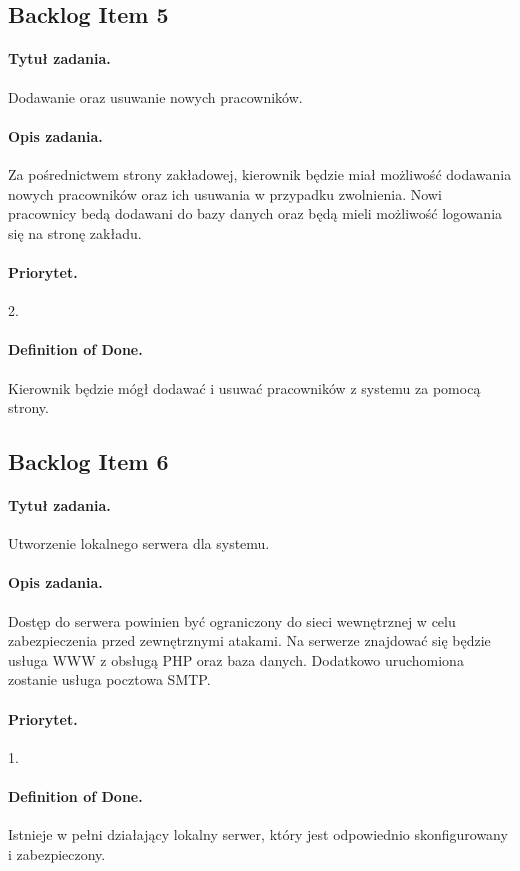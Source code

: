 \documentclass[a4paper]{article}
\begin{document}
\subsection{Backlog Item 5}
\paragraph{Tytuł zadania.} Dodawanie oraz usuwanie nowych pracowników.
\paragraph{Opis zadania.} Za pośrednictwem strony zakładowej, kierownik będzie miał możliwość dodawania nowych pracowników oraz ich usuwania w przypadku zwolnienia. Nowi pracownicy bedą dodawani do bazy danych oraz będą mieli możliwość logowania się na stronę zakładu.
\paragraph{Priorytet.} 2.
\paragraph{Definition of Done.} Kierownik będzie mógł dodawać i usuwać pracowników z systemu za pomocą strony.

\subsection{Backlog Item 6}
\paragraph{Tytuł zadania.} Utworzenie lokalnego serwera dla systemu.
\paragraph{Opis zadania.} Dostęp do serwera powinien być ograniczony do sieci wewnętrznej w celu zabezpieczenia przed zewnętrznymi atakami. Na serwerze znajdować się będzie usługa WWW z obsługą PHP oraz baza danych. Dodatkowo uruchomiona zostanie usługa pocztowa SMTP.
\paragraph{Priorytet.} 1.
\paragraph{Definition of Done.} Istnieje w pełni działający lokalny serwer, który jest odpowiednio skonfigurowany i zabezpieczony.
\end{document}
